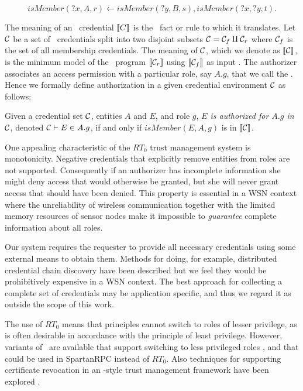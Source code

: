 \begin{displaymath}
\textit{isMember}(\textit{?x}, A, r) \leftarrow
  \textit{isMember}(\textit{?y}, B, s),
  \textit{isMember}(\textit{?x}, \textit{?y}, t).
\end{displaymath}

The meaning of an \RT\ credential $\llbracket C \rrbracket$ is the \datalog\ fact
or rule to which it translates. Let $\mathcal{C}$ be a set of \RT\
credentials split into two disjoint subsets $\mathcal{C} = \mathcal{C}_f \amalg
\mathcal{C}_r$ where $\mathcal{C}_f$ is the set of all membership credentials. The
meaning of $\mathcal{C}$, which we denote as $\llbracket \mathcal{C} \rrbracket$, is the
minimum model of the \datalog\ program $\llbracket \mathcal{C}_r \rrbracket$ using
$\llbracket \mathcal{C}_f \rrbracket$ as input \cite{Abiteboul:FD}. The authorizer
associates an access permission with a particular role, say $A.g$, that
we call the \newterm{governing role}. Hence we formally define
authorization in a given credential environment $\mathcal{C}$ as follows:

\begin{definition}
  Given a credential set $\mathcal{C}$, entities $A$ and $E$, and role $g$,
  \emph{$E$ is authorized for $A.g$ in $\mathcal{C}$}, denoted $\mathcal{C} \vdash
  E \in A.g$, if and only if $\textit{isMember}(E, A, g)$ is in
  $\llbracket \mathcal{C} \rrbracket$.
\end{definition}

One appealing characteristic of the $RT_0$ trust management system is
monotonicity. Negative credentials that explicitly remove entities from
roles are not supported. Consequently if an authorizer has incomplete
information she might deny access that would otherwise be granted, but
she will never grant access that should have been denied. This property
is essential in a WSN context where the unreliability of wireless
communication together with the limited memory resources of sensor nodes
make it impossible to \emph{guarantee} complete information about all
roles.

Our system requires the requester to provide all necessary credentials
using some external means to obtain them. Methods for doing, for
example, distributed credential chain discovery have been described
\cite{Li:DCDTM} but we feel they would be prohibitively expensive in a
WSN context. The best approach for collecting a complete set of
credentials may be application specific, and thus we regard it as
outside the scope of this work.

The use of $RT_0$ means that principles cannot switch to roles of lesser
privilege, as is often desirable in accordance with the principle of
least privilege. However, variants of \RT\ are available that support
switching to less privileged roles \cite{Li:RRBTMF}, and that could be
used in SpartanRPC instead of $RT_0$. Also techniques for supporting
certificate revocation in an \RT-style trust management framework have
been explored \cite{lbi-fc01}.

